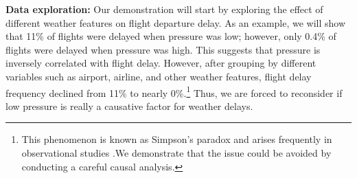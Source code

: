 {\bf Data exploration:} Our demonstration will start by exploring the effect of different weather features on flight departure delay. As an example, we will show that 11\% of flights were delayed when pressure was low; however, only 0.4\% of flights were delayed when pressure was high. This suggests that pressure is inversely correlated with flight delay. However, after grouping by different variables such as airport, airline, and other weather features, flight delay frequency declined from 11\% to nearly 0\%.\footnote{This phenomenon
is known as Simpson's paradox and arises frequently in observational studies \cite{pearl2014comment}.We demonstrate that the issue could be avoided by conducting a careful causal analysis.} Thus, we are forced to reconsider if low pressure is really a causative factor for weather delays.

